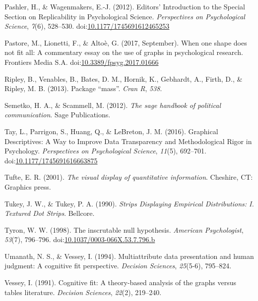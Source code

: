\documentclass[
  man]{apa6}
\begin{document}
\leavevmode\hypertarget{ref-Pashler2012a}{}%
Pashler, H., \& Wagenmakers, E.-J. (2012). Editors' Introduction to the Special Section on Replicability in Psychological Science. \emph{Perspectives on Psychological Science}, \emph{7}(6), 528--530. doi:\href{https://doi.org/10.1177/1745691612465253}{10.1177/1745691612465253}

\leavevmode\hypertarget{ref-Pastore2017}{}%
Pastore, M., Lionetti, F., \& Altoè, G. (2017, September). When one shape does not fit all: A commentary essay on the use of graphs in psychological research. Frontiers Media S.A. doi:\href{https://doi.org/10.3389/fpsyg.2017.01666}{10.3389/fpsyg.2017.01666}

\leavevmode\hypertarget{ref-ripley2013package}{}%
Ripley, B., Venables, B., Bates, D. M., Hornik, K., Gebhardt, A., Firth, D., \& Ripley, M. B. (2013). Package ``mass''. \emph{Cran R}, \emph{538}.

\leavevmode\hypertarget{ref-semetko2012sage}{}%
Semetko, H. A., \& Scammell, M. (2012). \emph{The sage handbook of political communication}. Sage Publications.

\leavevmode\hypertarget{ref-Tay2016a}{}%
Tay, L., Parrigon, S., Huang, Q., \& LeBreton, J. M. (2016). Graphical Descriptives: A Way to Improve Data Transparency and Methodological Rigor in Psychology. \emph{Perspectives on Psychological Science}, \emph{11}(5), 692--701. doi:\href{https://doi.org/10.1177/1745691616663875}{10.1177/1745691616663875}

\leavevmode\hypertarget{ref-Tufte2001}{}%
Tufte, E. R. (2001). \emph{The visual display of quantitative information}. Cheshire, CT: Graphics press.

\leavevmode\hypertarget{ref-Tukey1990}{}%
Tukey, J. W., \& Tukey, P. A. (1990). \emph{Strips Displaying Empirical Distributions: I. Textured Dot Strips}. Bellcore.

\leavevmode\hypertarget{ref-Tyron1998}{}%
Tyron, W. W. (1998). The inscrutable null hypothesis. \emph{American Psychologist}, \emph{53}(7), 796--796. doi:\href{https://doi.org/10.1037/0003-066X.53.7.796.b}{10.1037/0003-066X.53.7.796.b}

\leavevmode\hypertarget{ref-umanath1994multiattribute}{}%
Umanath, N. S., \& Vessey, I. (1994). Multiattribute data presentation and human judgment: A cognitive fit perspective. \emph{Decision Sciences}, \emph{25}(5-6), 795--824.

\leavevmode\hypertarget{ref-vessey1991cognitive}{}%
Vessey, I. (1991). Cognitive fit: A theory-based analysis of the graphs versus tables literature. \emph{Decision Sciences}, \emph{22}(2), 219--240.
\end{document}
